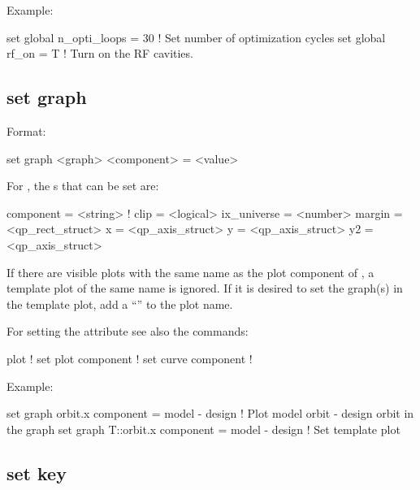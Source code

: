 {{Example:
\begin{example}
  set global n_opti_loops = 30  ! Set number of optimization cycles
  set global rf_on = T          ! Turn on the RF cavities.
\end{example}


\subsection{set graph}
\label{s:set.graph}

Format:
\begin{example}
  set graph <graph> <component> = <value>
\end{example}

For , the s that can be set are:
\begin{example}
  component   = <string>     ! 
  clip        = <logical>
  ix_universe = <number>
  margin      = <qp_rect_struct>
  x           = <qp_axis_struct>
  y           = <qp_axis_struct>
  y2          = <qp_axis_struct>
\end{example}

If there are visible plots with the same name as the plot component of , a template plot
of the same name is ignored. If it is desired to set the graph(s) in the template plot, add a
``'' to the plot name.

For setting the  attribute see also the commands:
\begin{example}
  plot                    ! 
  set plot component      ! 
  set curve component     ! 
\end{example}

Example:
\begin{example}
  set graph orbit.x component = model - design  
                          ! Plot model orbit - design orbit in the graph
  set graph T::orbit.x component = model - design  ! Set template plot
\end{example}


\subsection{set key}
\label{s:set.key}

}}
